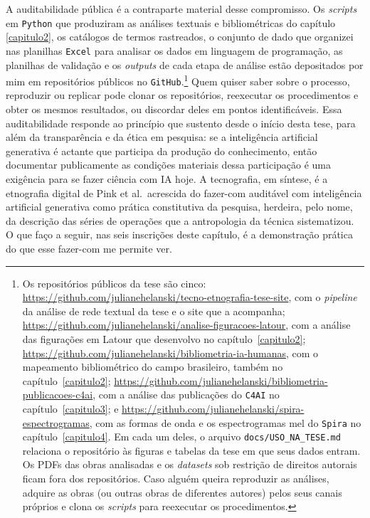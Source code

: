 A auditabilidade pública é a contraparte material desse compromisso. Os \emph{scripts} em \texttt{Python} que produziram as análises textuais e bibliométricas do capítulo \ref{capitulo2}, os catálogos de termos rastreados, o conjunto de dado que organizei nas planilhas \texttt{Excel} para analisar os dados em linguagem de programação, as planilhas de validação e os \emph{outputs} de cada etapa de análise estão depositados por mim em repositórios públicos no \texttt{GitHub}.\footnote{Os repositórios públicos da tese são cinco: \url{https://github.com/julianehelanski/tecno-etnografia-tese-site}, com o \emph{pipeline} da análise de rede textual da tese e o site que a acompanha; \url{https://github.com/julianehelanski/analise-figuracoes-latour}, com a análise das figurações em Latour que desenvolvo no capítulo~\ref{capitulo2}; \url{https://github.com/julianehelanski/bibliometria-ia-humanas}, com o mapeamento bibliométrico do campo brasileiro, também no capítulo~\ref{capitulo2}; \url{https://github.com/julianehelanski/bibliometria-publicacoes-c4ai}, com a análise das publicações do \texttt{C4AI} no capítulo~\ref{capitulo3}; e \url{https://github.com/julianehelanski/spira-espectrogramas}, com as formas de onda e os espectrogramas mel do \texttt{Spira} no capítulo~\ref{capitulo4}. Em cada um deles, o arquivo \texttt{docs/USO\_NA\_TESE.md} relaciona o repositório às figuras e tabelas da tese em que seus dados entram. Os PDFs das obras analisadas e os \emph{datasets} sob restrição de direitos autorais ficam fora dos repositórios. Caso alguém queira reproduzir as análises, adquire as obras (ou outras obras de diferentes autores) pelos seus canais próprios e clona os \emph{scripts} para reexecutar os procedimentos.} Quem quiser saber sobre o processo, reproduzir ou replicar pode clonar os repositórios, reexecutar os procedimentos e obter os mesmos resultados, ou discordar deles em pontos identificáveis. Essa auditabilidade responde ao princípio que sustento desde o início desta tese, para além da transparência e da ética em pesquisa: se a inteligência artificial generativa é actante que participa da produção do conhecimento, então documentar publicamente as condições materiais dessa participação é uma exigência para se fazer ciência com IA hoje. A tecnografia, em síntese, é a etnografia digital de Pink et al.\ acrescida do fazer-com auditável com inteligência artificial generativa como prática constitutiva da pesquisa, herdeira, pelo nome, da descrição das séries de operações que a antropologia da técnica sistematizou. O que faço a seguir, nas seis inscrições deste capítulo, é a demonstração prática do que esse fazer-com me permite ver.
 
